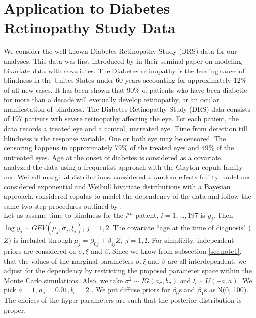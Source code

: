 \documentclass[11pt]{article}
\theoremstyle{remboldstyle}
\begin{document}
\section{Application to Diabetes Retinopathy Study Data}
\label{sec:drs}
\noindent
We consider the well known Diabetes Retinopathy Study (DRS) data for our analyses. This data was first introduced by \cite{huster:brookmeyer:self:1989} in their seminal paper on modeling bivariate data with covariates. The Diabetes retinopathy is the leading cause of blindness in the Unites States under 60 years accounting for approximately 12\% of all new cases. 
It has been shown that 90\% of patients who have been diabetic for more than a decade will evetually develop retinopathy, or an ocular manifestation of blindness. The Diabetes Retinopathy Study (DRS) data consists of 197 patients wth severe retinopathy affecting the eye. For each patient, the data records a treated eye and a control, untreated eye. Time from detection till blindness is the response variable. One or both eye may be censored. The censoring happens in approximately 79\% of the treated eyes and 49\% of the untreated eyes. Age at the onset of diabetes is considered as a covariate.\\ 
\noindent
\cite{huster:brookmeyer:self:1989} analyzed the data using a frequentist approach with the Clayton copula family and Weibull marginal distributions. \cite{th:gram:2000} considered a random effects frailty model and \cite{sahu:dey:2000} considered exponential and Weibull bivariate distributions with a Bayesian approach. \cite{romeo:tanaka:2006} considered copulas to model the dependency of the data and follow the same two step procedures outlined by \cite{shih:louis:1995}. \\
Let us assume time to blindness for the $i^{th}$ patient, $i = 1,...,197$ is $y_j$. Then $\log y_j \sim GEV(\mu_j, \sigma_j, \xi_j)$, $j = 1,2$. The covariate ``age at the time of diagnosis" ($Z$) is included through $\mu_j = \beta_{0j} + \beta_{1j}Z,\; j = 1,2$. For simplicity, independent priors are considered on $\sigma, \xi$ and $\beta$. Since we know from subsection \ref{sec:note1}, that the values of the marginal parameters  $\sigma, \xi$ and $\beta$ are all interdependent, we adjust for the dependency by restricting the proposed parameter space within the Monte Carlo simulations. Also, we take $\sigma^2 \sim IG(a_{\sigma}, b_{\sigma})$ and $\xi \sim U(-a, a)$. We pick $a = 1$, $a_{\sigma} = 0.01, b_{\sigma} = 2$ . We put diffuse priors for $\beta_0$s and $\beta_1$s as N(0, 100). The choices of the hyper parameters are such that the posterior distribution is proper.\\
\end{document}
